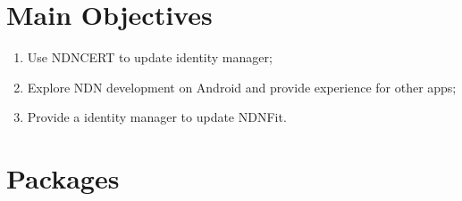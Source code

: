 \documentclass[a0,portrait]{poster}
\begin{document}
\begin{multicols}{2}
\color{DarkSlateGray} %

\section*{Main Objectives}

\begin{enumerate}
\item Use NDNCERT to update identity manager;
\item Explore NDN development on Android and provide experience for other apps;
\item Provide a identity manager to update NDNFit.
\end{enumerate}


\section*{Packages}



\end{multicols}
\end{document}
